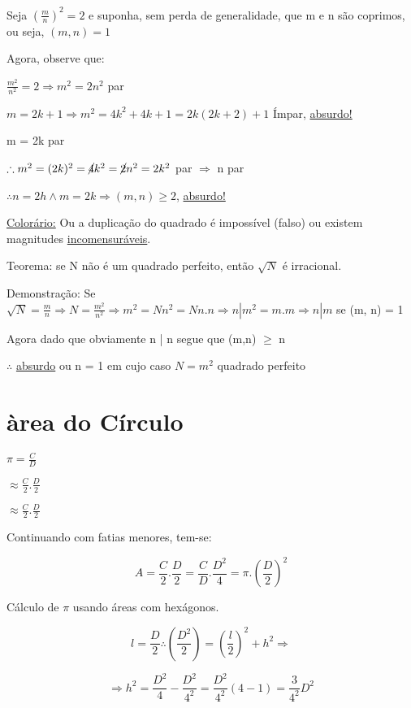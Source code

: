 \documentclass[a4paper, 12pt]{article}
\begin{document}
{Seja $(\frac{m}{n})^2 = 2$ e suponha, sem perda de generalidade, que m e n são coprimos, ou seja, $(m,n)=1$}

Agora, observe que:

\begin{center}
$\frac{m^2}{n^2} = 2 \Rightarrow m^2 = 2n^2$ par 

$m = 2k + 1 \Rightarrow m^2 = 4k^2 + 4k + 1 = 2k(2k + 2) + 1$ Ímpar, \underline{absurdo!}

{m = 2k par}

$\therefore m^2 = (2k)^2 = \cancel{4}k^2 = \cancel{2}n^2 = 2k^2$ par $\Rightarrow$ n par

$\therefore n = 2h \wedge  m = 2k \Rightarrow (m,n) \ge 2$, \underline{absurdo!}
\end{center}

\underline{Colorário:} Ou a duplicação do quadrado é impossível (falso) ou existem magnitudes \underline{incomensuráveis}.

Teorema: se N não é um quadrado perfeito, então $\sqrt{N}$ é irracional.

Demonstração: Se $\sqrt{N} = \frac{m}{n} \Rightarrow N = \frac{m^2}{n^2} \Rightarrow m^2 = Nn^2 = Nn.n \Rightarrow n | m^2 = m.m \Rightarrow n | m$ se (m, n) = 1 

Agora dado que obviamente n | n segue que (m,n) $\ge$ n

$\therefore$ \underline{absurdo} ou n = 1 em cujo caso $N = m^2$ quadrado perfeito

\section{àrea do Círculo}

$\pi = \frac{C}{D}$

$\approx\frac{C}{2}.\frac{D}{2}$

$\approx\frac{C}{2}.\frac{D}{2}$

Continuando com fatias menores, tem-se:

\[A = \frac{C}{2}.\frac{D}{2} = \frac{C}{D}.\frac{D^2}{4} = \pi.(\frac{D}{2})^2\]

Cálculo de $\pi$ usando áreas com hexágonos.

\[l = \frac{D}{2} \therefore (\frac{D^2}{2}) = (\frac{l}{2})^2 + h^2 \Rightarrow \]

\[\Rightarrow h^2 = \frac{D^2}{4} - \frac{D^2}{4^2} = \frac{D^2}{4^2} (4-1) = \frac{3}{4^2}D^2\]
\end{document}
